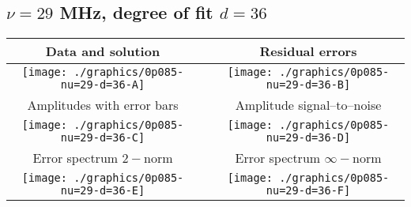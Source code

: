 

% 

\clearpage{}
\break{}

\subsection{$\nu = 29$ MHz, degree of fit $d = 36$}

\begin{table}[h]
    \begin{center}
        \begin{tabular}{ccc}
            Data and solution & \quad & Residual errors \\\hline
            \texttt{[image: ./graphics/0p085-nu=29-d=36-A]} &&
            \texttt{[image: ./graphics/0p085-nu=29-d=36-B]} \\[15pt]
            Amplitudes with error bars && Amplitude signal--to--noise \\\hline
            \texttt{[image: ./graphics/0p085-nu=29-d=36-C]} &&
            \texttt{[image: ./graphics/0p085-nu=29-d=36-D]} \\[15pt]
            Error spectrum $2-$norm && Error spectrum $\infty-$norm \\\hline
            \texttt{[image: ./graphics/0p085-nu=29-d=36-E]} &&
            \texttt{[image: ./graphics/0p085-nu=29-d=36-F]} \\[15pt]
        \end{tabular}
    \end{center}
\label{fig:elev=85, nu=29}
\end{table}



\endinput
